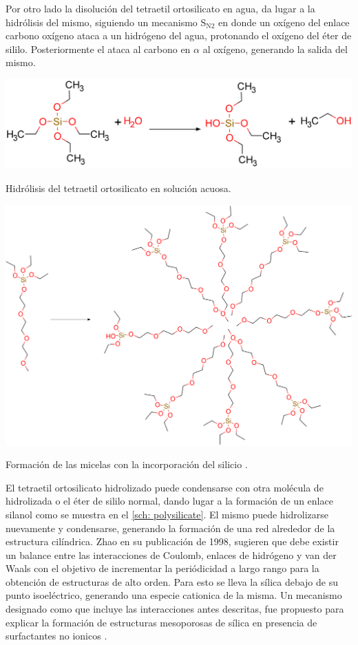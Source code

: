\documentclass[fleqn, 12pt]{SelfArx}
\begin{document}
Por otro lado la disoluci\'on del tetraetil ortosilicato en agua, da lugar a la hidr\'olisis del mismo, siguiendo un mecanismo S$_\text{N2}$ en donde un ox\'igeno del enlace carbono ox\'igeno ataca a un hidr\'ogeno del agua, protonando el ox\'igeno del \'eter de sililo. Posteriormente el  ataca al carbono en $\alpha$ al ox\'igeno, generando la salida del mismo. 
\begin{scheme}[h]
	\centering
	\includegraphics[width=\linewidth]{structures/hidrosilicate.png}
	\caption{Hidr\'olisis del tetraetil ortosilicato en soluci\'on acuosa.}
	\label{sch: hidrosilicate}
\end{scheme}
\begin{scheme}[h]
	\centering
	\includegraphics[width=\linewidth]{structures/micelaSi.png}
	\caption{Formaci\'on de las micelas con la incorporaci\'on del silicio \cite{yang_2011}.}
	\label{sch: micelaSi1}
\end{scheme}

El tetraetil ortosilicato hidrolizado puede condensarse con otra mol\'ecula de hidrolizada o el \'eter de sililo normal, dando lugar a la formaci\'on de un enlace silanol como se muestra en el \autoref{sch: polysilicate}. El mismo puede hidrolizarse nuevamente y condensarse, generando la formaci\'on de una red alrededor de la estructura cil\'indrica. Zhao en su publicaci\'on de 1998, sugieren que debe existir un balance entre las interacciones de Coulomb, enlaces de hidr\'ogeno y van der Waals con el objetivo de incrementar la peri\'odicidad a largo rango para la obtenci\'on de estructuras de alto orden. Para esto se lleva la s\'ilica debajo de su punto isoel\'ectrico, generando una especie cationica de la misma. Un mecanismo designado como  que incluye las interacciones antes descritas, fue propuesto para explicar la formaci\'on de estructuras mesoporosas de s\'ilica en presencia de surfactantes no ionicos \cite{yang_2011}.
 
\end{document}
